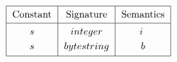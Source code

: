 \documentclass[../plutus-core-specification.tex]{subfiles}
\begin{document}

\begin{minipage}{\linewidth}
\centering
   \(\begin{tabular}{|c|c|c|}\hline
    \Strut
        \textrm{Constant} & \textrm{Signature} & \textrm{Semantics}\\
        \hline
        $s$   & $\constsig{integer}$  &$i$ \rule{0mm}{4mm} \\[3pt]
        $s$   & $\constsig{bytestring}$ & $b$\\[3pt]
        \hline
    \end{tabular}\)
    \label{fig:constants}
\end{minipage}

\end{document}
